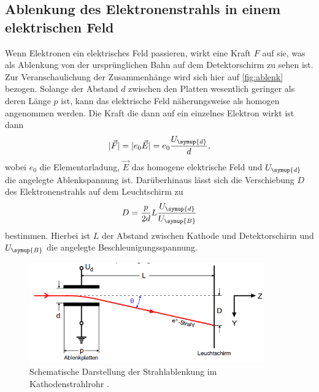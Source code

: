 \subsection{Ablenkung des Elektronenstrahls in einem elektrischen Feld}
    Wenn Elektronen ein elektrisches Feld passieren, wirkt eine Kraft $F$ auf sie, was als Ablenkung von der ursprünglichen Bahn auf dem 
    Detektorschirm zu sehen ist. Zur Veranschaulichung der Zusammenhänge wird sich hier auf \autoref{fig:ablenk} bezogen. Solange der 
    Abstand $d$ zwischen den Platten wesentlich geringer als deren Länge $p$ ist, kann das elektrische Feld näherungsweise als
    homogen angenommen werden. Die Kraft die dann auf ein einzelnes Elektron wirkt ist dann
    \begin{equation}
    \label{eqn:e_kraft}
        \lvert \vec{F} \rvert = \lvert e_0 \vec{E} \rvert = e_0 \frac{U_{\symup{d}}}{d},
    \end{equation}    
    wobei $e_0$ die Elementarladung, $\vec{E}$ das homogene elektrische Feld und $U_{\symup{d}}$ die angelegte Ablenkspannung ist.
    Darüberhinaus lässt sich die Verschiebung $D$ des Elektronenstrahls auf dem Leuchtschirm zu
    \begin{equation}
    \label{eqn:e_verschiebung}
        D = \frac{p}{2 d} L \frac{U_{\symup{d}}}{U_{\symup{B}}}
    \end{equation}
    bestimmen. Hierbei ist $L$ der Abstand zwischen Kathode und Detektorschirm und $U_{\symup{B}}$ die angelegte Beschleunigungsspannung.
    \begin{figure}
        \centering
        \includegraphics[width=0.9\textwidth]{content/eablenk.png}
        \caption{Schematische Darstellung der Strahlablenkung im Kathodenstrahlrohr \cite{V501-und-V502}.}
        \label{fig:ablenk}
    \end{figure}
